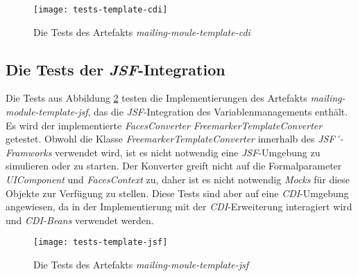 \begin{figure}[h]
\centering
\texttt{[image: tests-template-cdi]}
\caption{Die Tests des Artefakts \emph{mailing-moule-template-cdi}}
\label{fig:tests-template-cdi}
\end{figure}

\subsection{Die Tests der \emph{JSF}-Integration}
Die Tests aus Abbildung \ref{fig:tests-template-jsf} testen die Implementierungen des Artefakts \emph{mailing-module-template-jsf}, das die \emph{JSF}-Integration des Variablenmanagements enthält. Es wird der implementierte \emph{FacesConverter FreemarkerTemplateConverter} getestet. Obwohl die Klasse \emph{FreemarkerTemplateConverter} innerhalb des \emph{JSF´-Framworks} verwendet wird, ist es nicht notwendig eine \emph{JSF}-Umgebung zu simulieren oder zu starten. Der Konverter greift nicht auf die Formalparameter \emph{UIComponent} und \emph{FacesContext} zu, daher ist es nicht notwendig \emph{Mocks} für diese Objekte zur Verfügung zu stellen.
\newline
\newline
Diese Tests sind aber auf eine \emph{CDI}-Umgebung angewiesen, da in der Implementierung mit der \emph{CDI}-Erweiterung interagiert wird und \emph{CDI-Beans} verwendet werden.
\newpage

\begin{figure}
\centering
\texttt{[image: tests-template-jsf]}
\caption{Die Tests des Artefakts \emph{mailing-moule-template-jsf}}
\label{fig:tests-template-jsf}
\end{figure}

